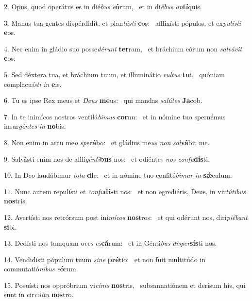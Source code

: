 2. Opus, quod operátus es in dié\textit{bus} \textit{e}\textbf{ó}rum, \ast\  et in di\textit{é}\textit{bus} \textit{an}\textbf{tí}quis.\

3. Manus tua gentes dispérdidit, et plan\textit{tás}\textit{ti} \textbf{e}os: \ast\  afflixísti pópulos, et ex\textit{pu}\textit{lís}\textit{ti} \textbf{e}os.\

4. Nec enim in gládio suo posse\textit{dé}\textit{runt} \textbf{ter}ram, \ast\  et bráchium eórum non \textit{sal}\textit{vá}\textit{vit} \textbf{e}os:\

5. Sed déxtera tua, et bráchium tuum, et illuminátio \textit{vul}\textit{tus} \textbf{tu}i, \ast\  quóniam complacu\textit{ís}\textit{ti} \textit{in} \textbf{e}is.\

6. Tu es ipse Rex meus et \textit{De}\textit{us} \textbf{me}us: \ast\  qui mandas \textit{sa}\textit{lú}\textit{tes} \textbf{Ja}cob.\

7. In te inimícos nostros ventilá\textit{bi}\textit{mus} \textbf{cor}nu: \ast\  et in nómine tuo spernémus insur\textit{gén}\textit{tes} \textit{in} \textbf{no}bis.\

8. Non enim in arcu me\textit{o} \textit{spe}\textbf{rá}bo: \ast\  et gládius me\textit{us} \textit{non} \textit{sal}\textbf{vá}bit me.\

9. Salvásti enim nos de affli\textit{gén}\textit{ti}\textbf{bus} nos: \ast\  et odiéntes \textit{nos} \textit{con}\textit{fu}\textbf{dís}ti.\

10. In Deo laudábimur \textit{to}\textit{ta} \textbf{di}e: \ast\  et in nómine tuo confité\textit{bi}\textit{mur} \textit{in} \textbf{sǽ}culum.\

11. Nunc autem repulísti et \textit{con}\textit{fu}\textbf{dís}ti nos: \ast\  et non egrediéris, Deus, in vir\textit{tú}\textit{ti}\textit{bus} \textbf{nos}tris.\

12. Avertísti nos retrórsum post ini\textit{mí}\textit{cos} \textbf{nos}tros: \ast\  et qui odérunt nos, diri\textit{pi}\textit{é}\textit{bant} \textbf{si}bi.\

13. Dedísti nos tamquam o\textit{ves} \textit{es}\textbf{cá}rum: \ast\  et in Génti\textit{bus} \textit{di}\textit{sper}\textbf{sís}ti nos.\

14. Vendidísti pópulum tuum \textit{si}\textit{ne} \textbf{pré}tio: \ast\  et non fuit multitúdo in commutatió\textit{ni}\textit{bus} \textit{e}\textbf{ó}rum.\

15. Posuísti nos oppróbrium vi\textit{cí}\textit{nis} \textbf{nos}tris, \ast\  subsannatiónem et derísum his, qui sunt in cir\textit{cú}\textit{i}\textit{tu} \textbf{nos}tro.\

